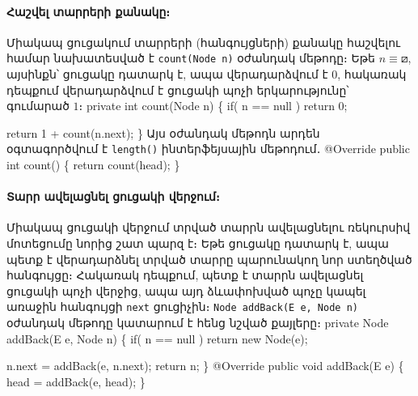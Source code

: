 %
%
\paragraph{Հաշվել տարրերի քանակը։}
Միակապ ցուցակում տարրերի (հանգույցների) քանակը հաշվելու համար 
նախատեսված է \texttt{count(Node n)} օժանդակ մեթոդը։ Եթե 
\(n\equiv\boxslash\), այսինքն՝ ցուցակը դատարկ է, ապա վերադարձվում 
է \(0\), հակառակ դեպքում վերադարձվում է ցուցակի պոչի 
երկարությունը՝ գումարած \(1\)։
\nwenddocs{}\endmoddef{}
private int count(Node n)
\{
  if( n == null )
    return 0;

  return 1 + count(n.next);
\}
\nwendcode{}\nwdocspar
Այս օժանդակ մեթոդն արդեն օգտագործվում է \texttt{length()} 
ինտերֆեյսային մեթոդում․
\nwenddocs{}\plusendmoddef
@Override
public int count()
\{
  return count(head);
\}
\nwendcode{}\nwdocspar


%
%
\paragraph{Տարր ավելացնել ցուցակի վերջում։}
Միակապ ցուցակի վերջում տրված տարրն ավելացնելու ռեկուրսիվ մոտեցումը
նորից շատ պարզ է։ Եթե ցուցակը դատարկ է, ապա պետք է վերադարձնել 
տրված տարրը պարունակող նոր ստեղծված հանգույցը։ Հակառակ դեպքում,
պետք է տարրն ավելացնել ցուցակի պոչի վերջից, ապա այդ ձևափոխված 
պոչը կապել առաջին հանգույցի \texttt{next} ցուցիչին։ 
\texttt{Node addBack(E e, Node n)} օժանդակ մեթոդը կատարում է 
հենց նշված քայլերը։
\nwenddocs{}\endmoddef{}
private Node addBack(E e, Node n)
\{
  if( n == null )
    return new Node(e);

  n.next = addBack(e, n.next);
  return n;
\}
@Override
public void addBack(E e)
\{
  head = addBack(e, head);
\}
\nwendcode{}\nwdocspar


